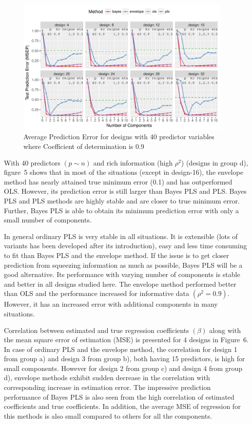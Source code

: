 \documentclass[num-refs]{wiley-article}
\begin{document}
\begin{figure}[!hptb]
\centering
\includegraphics[width = 0.95\textwidth]{prediction-error-40-2.pdf}
\caption[Prediction Error - 4]{Average Prediction Error for designs with 40 predictor
variables where Coefficient of determination is 0.9}
\label{fig:pred-error-40-2}
\end{figure}

With 40 predictors $(p\sim n)$ and rich information (high $\rho^2$) (designs in group d), figure~5 shows that in most of the situations (except in design-16), the envelope method has nearly attained true minimum error (0.1) and has outperformed OLS. However, its prediction error is still larger than Bayes PLS and PLS. Bayes PLS and PLS methods are highly stable and are closer to true minimum error.  Further, Bayes PLS is able to obtain its minimum prediction error with only a small number of components.

In general ordinary PLS is very stable in all situations. It is extensible (lots of variants has been developed after its introduction), easy and less time consuming to fit than Bayes PLS and the envelope method. If the issue is to get closer prediction from squeezing information as much as possible, Bayes PLS will be a good alternative. Its performance with varying number of components is stable and better in all designs studied here. The envelope method performed better than OLS and the performance increased for informative data $(\rho^2 = 0.9)$. However, it has an increased error with additional components in many situations.

Correlation between estimated and true regression coefficients $(\beta)$ along with the mean square error of estimation (MSE) is presented for 4 designs in Figure~6. In case of ordinary PLS and the envelope method, the correlation for design 1 from group a) and design 3 from group b), both having 15 predictors, is high for small components. However for design 2 from group c) and design 4 from group d), envelope methods exhibit sudden decrease in the correlation with corresponding increase in estimation error. The impressive prediction performance of Bayes PLS is also seen from the high correlation of estimated coefficients and true coefficients. In addition, the average MSE of regression for this methods is also small compared to others for all the components.
\end{document}
